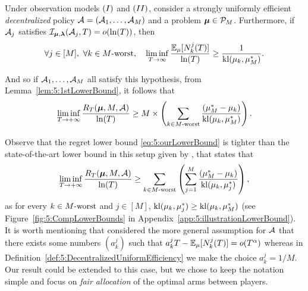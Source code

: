 \begin{theorem}\label{thm:5:BetterLowerBound}
\begin{leftbar}[theorembar]  %
  Under observation models $(I)$ and $(II)$, consider a strongly uniformly efficient \emph{decentralized} policy $\mathcal{A}=(\mathcal{A}_1,\dots,\mathcal{A}_M)$ and a problem $\boldsymbol{\mu}\in\mathcal{P}_M$.
  Furthermore, if $\mathcal{A}_j$ satisfies $\mathcal{I}_{\bm{\mu},\bm{\lambda}}(\mathcal{A}_j,T) = \mathop{}\mathopen{}o\mathopen{}\left(\ln(T)\right)$, then
  \begin{equation}\label{eq:5:LBDraws}
    \forall j \in [M], \ \forall k \in M\text{-}\mathrm{worst}, \ \ \ \liminf_{T\to \infty} \frac{\mathbb{E}_{\mu}[N_k^j(T)]}{\ln(T)} \geq \frac{1}{\mathrm{kl}(\mu_k, \mu_M^*)}.
  \end{equation}

  \noindent And so if $\mathcal{A}_1,\dots,\mathcal{A}_M$ all satisfy this hypothesis, from Lemma~\ref{lem:5:1stLowerBound}, it follows that
  \begin{equation}\label{eq:5:ourLowerBound}
    \mathop{\lim\inf}\limits_{T \to +\infty} \frac{R_T(\boldsymbol{\mu}, M, \mathcal{A})}{\ln(T)}
    \geq M \times \left( \sum_{k \in M\text{-}\mathrm{worst}} \frac{(\mu_M^* -  \mu_k)}{\mathrm{kl}(\mu_k, \mu_M^*)} \right) .
  \end{equation}
\end{leftbar}  %
\end{theorem}


Observe that the regret lower bound \eqref{eq:5:ourLowerBound} is tighter than the state-of-the-art lower bound in this setup
given by \cite{Zhao10}, that states that
\begin{equation}\label{eq:5:Zhao10LowerBound}
  \mathop{\lim\inf}\limits_{T \to +\infty} \frac{R_T(\boldsymbol{\mu}, M, \mathcal{A})}{\ln(T)}
  \geq \sum_{k \in M\text{-}\mathrm{worst}} \left( \sum_{j=1}^{M} \frac{(\mu_M^* -  \mu_k)}{\mathrm{kl}(\mu_k, \mu_{j}^*)} \right),
\end{equation}
as for every $k \in M\text{-}\mathrm{worst}$ and $j \in [M]$, $\mathrm{kl}(\mu_k, \mu_j^*) \geq \mathrm{kl}(\mu_k, \mu_M^*)$
(see Figure~\ref{fig:5:CompLowerBounds} in Appendix~\ref{app:5:illustrationLowerBound}).
%
It is worth mentioning that \cite{Zhao10} considered the more general assumption for $\mathcal{A}$ that there exists some numbers $(a_{k}^j)$ such that $a_{k}^j T - \mathbb{E}_{\mu}[N_k^j(T)] = o(T^\alpha)$ whereas in Definition~\ref{def:5:DecentralizedUniformEfficiency} we make the choice $a_{k}^j = 1/M$.
Our result could be extended to this case, but we chose to keep the notation simple and focus on \emph{fair allocation} of the optimal arms between players.


